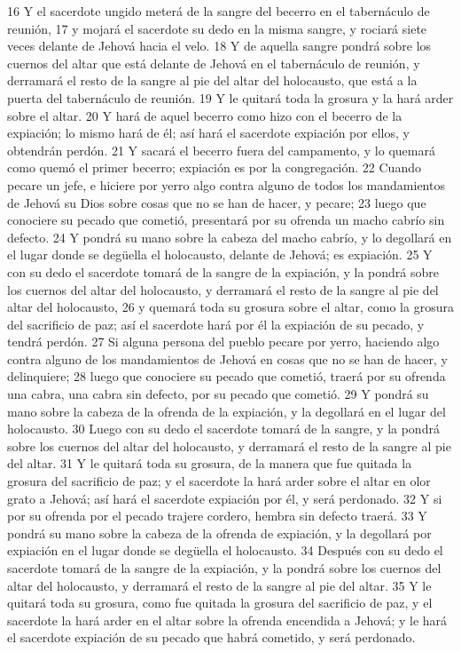 16 Y el sacerdote ungido meterá de la sangre del becerro en el tabernáculo de reunión,
17 y mojará el sacerdote su dedo en la misma sangre, y rociará siete veces delante de Jehová hacia el velo.
18 Y de aquella sangre pondrá sobre los cuernos del altar que está delante de Jehová en el tabernáculo de reunión, y derramará el resto de la sangre al pie del altar del holocausto, que está a la puerta del tabernáculo de reunión.
19 Y le quitará toda la grosura y la hará arder sobre el altar.
20 Y hará de aquel becerro como hizo con el becerro de la expiación; lo mismo hará de él; así hará el sacerdote expiación por ellos, y obtendrán perdón.
21 Y sacará el becerro fuera del campamento, y lo quemará como quemó el primer becerro; expiación es por la congregación.
22 Cuando pecare un jefe, e hiciere por yerro algo contra alguno de todos los mandamientos de Jehová su Dios sobre cosas que no se han de hacer, y pecare;
23 luego que conociere su pecado que cometió, presentará por su ofrenda un macho cabrío sin defecto.
24 Y pondrá su mano sobre la cabeza del macho cabrío, y lo degollará en el lugar donde se degüella el holocausto, delante de Jehová; es expiación.
25 Y con su dedo el sacerdote tomará de la sangre de la expiación, y la pondrá sobre los cuernos del altar del holocausto, y derramará el resto de la sangre al pie del altar del holocausto,
26 y quemará toda su grosura sobre el altar, como la grosura del sacrificio de paz; así el sacerdote hará por él la expiación de su pecado, y tendrá perdón.
27 Si alguna persona del pueblo pecare por yerro, haciendo algo contra alguno de los mandamientos de Jehová en cosas que no se han de hacer, y delinquiere;
28 luego que conociere su pecado que cometió, traerá por su ofrenda una cabra, una cabra sin defecto, por su pecado que cometió.
29 Y pondrá su mano sobre la cabeza de la ofrenda de la expiación, y la degollará en el lugar del holocausto.
30 Luego con su dedo el sacerdote tomará de la sangre, y la pondrá sobre los cuernos del altar del holocausto, y derramará el resto de la sangre al pie del altar.
31 Y le quitará toda su grosura, de la manera que fue quitada la grosura del sacrificio de paz; y el sacerdote la hará arder sobre el altar en olor grato a Jehová; así hará el sacerdote expiación por él, y será perdonado.
32 Y si por su ofrenda por el pecado trajere cordero, hembra sin defecto traerá.
33 Y pondrá su mano sobre la cabeza de la ofrenda de expiación, y la degollará por expiación en el lugar donde se degüella el holocausto.
34 Después con su dedo el sacerdote tomará de la sangre de la expiación, y la pondrá sobre los cuernos del altar del holocausto, y derramará el resto de la sangre al pie del altar.
35 Y le quitará toda su grosura, como fue quitada la grosura del sacrificio de paz, y el sacerdote la hará arder en el altar sobre la ofrenda encendida a Jehová; y le hará el sacerdote expiación de su pecado que habrá cometido, y será perdonado.  

